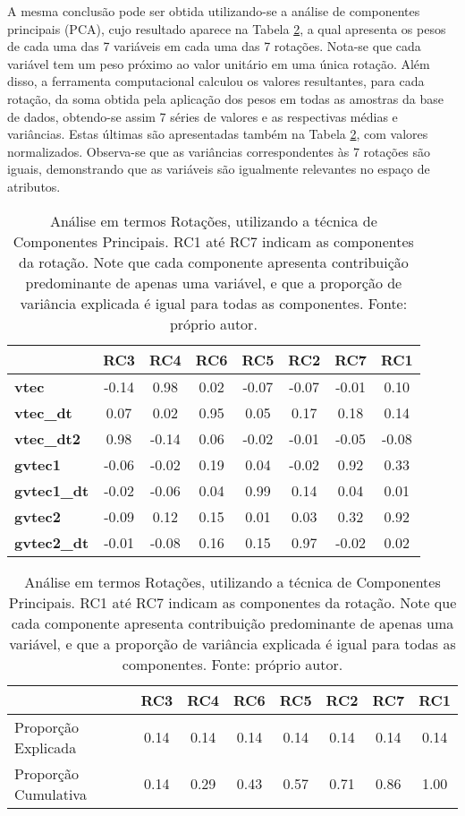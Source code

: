 A mesma conclusão pode ser obtida utilizando-se a análise de componentes principais (PCA), cujo resultado aparece na Tabela \ref{tab:pca1}, a qual apresenta os pesos de cada uma das 7 variáveis em cada uma das 7 rotações. Nota-se que cada variável tem um peso próximo ao valor unitário em uma única rotação. Além disso, a ferramenta computacional calculou os valores resultantes, para cada rotação, da soma obtida pela aplicação dos pesos em todas as amostras da base de dados, obtendo-se assim 7 séries de valores e as respectivas médias e variâncias. Estas últimas são apresentadas também na Tabela \ref{tab:pca1}, com valores normalizados. Observa-se que as variâncias correspondentes às 7 rotações são iguais, demonstrando que as variáveis são igualmente relevantes no espaço de atributos.

\begin{table}[hhh]
\begin{center}
\begin{tabular}{|l|c|c|c|c|c|c|c|} 
\hline
                 &   RC3 &   RC4 &  RC6 &   RC5 &   RC2 &   RC7 &   RC1 \\ \hline
{\bf vtec      } & -0.14 &  0.98 & 0.02 & -0.07 & -0.07 & -0.01 &  0.10 \\ \hline
{\bf vtec\_dt  } &  0.07 &  0.02 & 0.95 &  0.05 &  0.17 &  0.18 &  0.14 \\ \hline
{\bf vtec\_dt2 } &  0.98 & -0.14 & 0.06 & -0.02 & -0.01 & -0.05 & -0.08 \\ \hline 
{\bf gvtec1    } & -0.06 & -0.02 & 0.19 &  0.04 & -0.02 &  0.92 &  0.33 \\ \hline
{\bf gvtec1\_dt} & -0.02 & -0.06 & 0.04 &  0.99 &  0.14 &  0.04 &  0.01 \\ \hline
{\bf gvtec2    } & -0.09 &  0.12 & 0.15 &  0.01 &  0.03 &  0.32 &  0.92 \\ \hline
{\bf gvtec2\_dt} & -0.01 & -0.08 & 0.16 &  0.15 &  0.97 & -0.02 &  0.02 \\ \hline
\end{tabular}

\vspace{12pt}

\begin{tabular}{|l|c|c|c|c|c|c|c|}
\hline
                 &   RC3 &   RC4 &  RC6 &   RC5 &   RC2 &   RC7 &   RC1 \\ \hline
Proporção Explicada  & 0.14 & 0.14 & 0.14 & 0.14 & 0.14 & 0.14 & 0.14 \\ \hline
Proporção Cumulativa & 0.14 & 0.29 & 0.43 & 0.57 & 0.71 & 0.86 & 1.00 \\ \hline
\end{tabular}
\end{center}
\vspace{12pt}
\caption{Análise em termos Rotações, utilizando a técnica de Componentes Principais. RC1 até RC7 indicam as componentes da rotação. Note que cada componente apresenta contribuição predominante de apenas uma variável, e que a proporção de variância explicada é igual para todas as componentes. Fonte: próprio autor.}
\label{tab:pca1}
\end{table}


